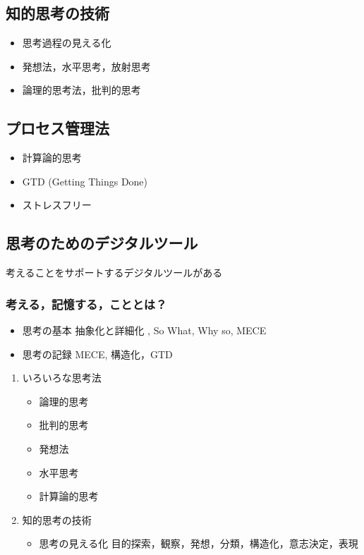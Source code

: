 \documentclass[dvipdfmx,11pat]{jarticle}
\begin{document}
\subsection{知的思考の技術}
\label{sec:org982108e}
\begin{itemize}
\item 思考過程の見える化
\item 発想法，水平思考，放射思考
\item 論理的思考法，批判的思考
\end{itemize}

\subsection{プロセス管理法}
\label{sec:org1ae8332}
\begin{itemize}
\item 計算論的思考
\item GTD (Getting Things Done)
\item ストレスフリー
\end{itemize}

\subsection{思考のためのデジタルツール}
\label{sec:org36ed512}
考えることをサポートするデジタルツールがある

\subsubsection{考える，記憶する，こととは？}
\label{sec:orgd84e836}

\begin{itemize}
\item 思考の基本 抽象化と詳細化 , So What, Why so, MECE
\item 思考の記録 MECE, 構造化，GTD
\end{itemize}

\begin{enumerate}
\item いろいろな思考法
\label{sec:orgcabe438}
\begin{itemize}
\item 論理的思考
\item 批判的思考
\item 発想法
\item 水平思考
\item 計算論的思考
\end{itemize}

\item 知的思考の技術
\label{sec:orgc0b6600}
\begin{itemize}
\item 思考の見える化
目的探索，観察，発想，分類，構造化，意志決定，表現
\end{itemize}
\end{enumerate}
\end{document}
